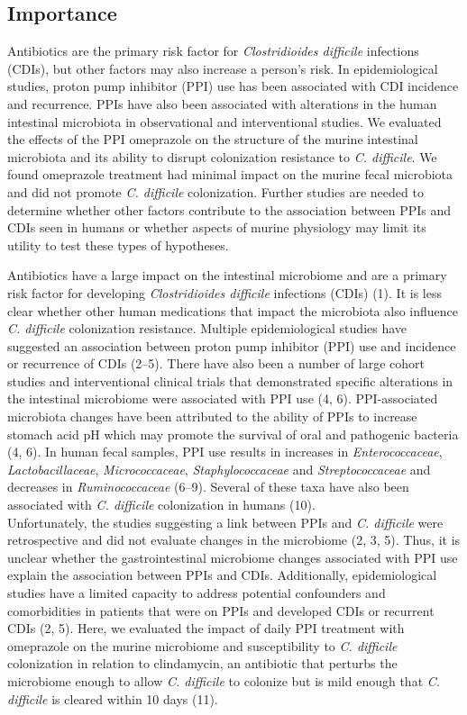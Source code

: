 \documentclass[11pt,]{article}
\begin{document}
\subsection{Importance}\label{importance}

Antibiotics are the primary risk factor for \emph{Clostridioides
difficile} infections (CDIs), but other factors may also increase a
person's risk. In epidemiological studies, proton pump inhibitor (PPI)
use has been associated with CDI incidence and recurrence. PPIs have
also been associated with alterations in the human intestinal microbiota
in observational and interventional studies. We evaluated the effects of
the PPI omeprazole on the structure of the murine intestinal microbiota
and its ability to disrupt colonization resistance to \emph{C.
difficile}. We found omeprazole treatment had minimal impact on the
murine fecal microbiota and did not promote \emph{C. difficile}
colonization. Further studies are needed to determine whether other
factors contribute to the association between PPIs and CDIs seen in
humans or whether aspects of murine physiology may limit its utility to
test these types of hypotheses.

\newpage

Antibiotics have a large impact on the intestinal microbiome and are a
primary risk factor for developing \emph{Clostridioides difficile}
infections (CDIs) (1). It is less clear whether other human medications
that impact the microbiota also influence \emph{C. difficile}
colonization resistance. Multiple epidemiological studies have suggested
an association between proton pump inhibitor (PPI) use and incidence or
recurrence of CDIs (2--5). There have also been a number of large cohort
studies and interventional clinical trials that demonstrated specific
alterations in the intestinal microbiome were associated with PPI use
(4, 6). PPI-associated microbiota changes have been attributed to the
ability of PPIs to increase stomach acid pH which may promote the
survival of oral and pathogenic bacteria (4, 6). In human fecal samples,
PPI use results in increases in \emph{Enterococcaceae},
\emph{Lactobacillaceae}, \emph{Micrococcaceae}, \emph{Staphylococcaceae}
and \emph{Streptococcaceae} and decreases in \emph{Ruminococcaceae}
(6--9). Several of these taxa have also been associated with \emph{C.
difficile} colonization in humans (10).\\
Unfortunately, the studies suggesting a link between PPIs and \emph{C.
difficile} were retrospective and did not evaluate changes in the
microbiome (2, 3, 5). Thus, it is unclear whether the gastrointestinal
microbiome changes associated with PPI use explain the association
between PPIs and CDIs. Additionally, epidemiological studies have a
limited capacity to address potential confounders and comorbidities in
patients that were on PPIs and developed CDIs or recurrent CDIs (2, 5).
Here, we evaluated the impact of daily PPI treatment with omeprazole on
the murine microbiome and susceptibility to \emph{C. difficile}
colonization in relation to clindamycin, an antibiotic that perturbs the
microbiome enough to allow \emph{C. difficile} to colonize but is mild
enough that \emph{C. difficile} is cleared within 10 days (11).
\end{document}
